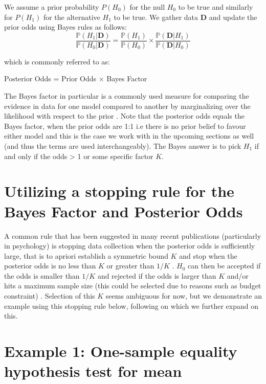 \documentclass{article}
\begin{document}
We assume a prior probability $P(H_0)$ for the null $H_0$ to be true and similarly for $P(H_1)$ for the alternative $H_1$ to be true. We gather data $\textbf{D}$ and update the prior odds using Bayes rules as follows:
\begin{equation}
    \frac{\mathbb{P}(H_1|\textbf{D})}{\mathbb{P}(H_0|\textbf{D})} = \frac{\mathbb{P}(H_1)}{\mathbb{P}(H_0)} \times \frac{\mathbb{P}(\textbf{D}|H_1)}{\mathbb{P}(\textbf{D}|H_0)}
\end{equation}

which is commonly referred to as:

\begin{center}
Posterior Odds = Prior Odds $\times$ Bayes Factor
\end{center}

The Bayes factor in particular is a commonly used measure for comparing the evidence in data for one model compared to another by marginalizing over the likelihood with respect to the prior \cite{deng}.  Note that the posterior odds equals the Bayes factor, when the prior odds are 1:1 i.e there is no prior belief to favour either model and this is the case we work with in the upcoming sections as well (and thus the terms are used interchangeably). The Bayes answer is to pick $H_1$ if and only if the odds > 1 or some specific factor $K$.

\section{Utilizing a stopping rule for the Bayes Factor and Posterior Odds}

A common rule that has been suggested in many recent publications (particularly in psychology) is stopping data collection when the posterior odds is sufficiently large, that is to apriori establish a symmetric bound $K$ and stop when the posterior odds is no less than $K$ or greater than $1/K$ \cite{deng}. $H_0$ can then be accepted if the odds is smaller than $1/K$ and rejected if the odds is larger than $K$ and/or hits a maximum sample size (this could be selected due to reasons such as budget constraint) \cite{deng}. Selection of this $K$ seems ambiguous for now, but we demonstrate an example using this stopping rule below, following on which we further expand on this.

\section{Example 1: One-sample equality hypothesis test for mean}
\end{document}

